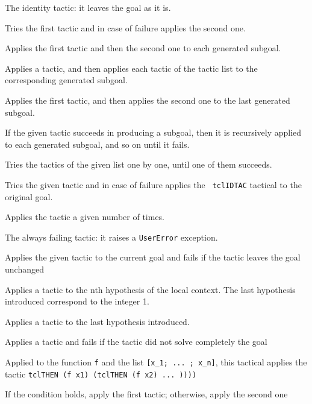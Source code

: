 \begin{description}
    {The identity tactic: it leaves the goal as it is.}

    {Tries the first tactic and in case of failure applies the second one.}

  {Applies the first tactic and then the second one to each generated subgoal.}

    {Applies a tactic, and then applies each tactic of the tactic list to the
     corresponding generated subgoal.}

    {Applies the first tactic, and then applies the second one to the last
     generated subgoal.}

    {If the given tactic succeeds in producing a subgoal, then it
     is recursively applied to each generated subgoal, 
     and so on until it fails. }

    {Tries the tactics of the given list one by one, until one of them
     succeeds.}

    {Tries the given tactic and in case of failure applies the {\tt
    tclIDTAC} tactical to the original goal.}

    {Applies the tactic a given number of times.}

    {The always failing tactic: it raises a {\tt UserError} exception.}

    {Applies the given tactic to the current goal and fails if the 
     tactic leaves the goal unchanged}

    {Applies a tactic to the nth hypothesis of the local context.
     The last hypothesis introduced correspond to the integer 1.}

    {Applies a tactic to the last hypothesis introduced.}

    {Applies a tactic and fails if the tactic did not solve completely the
      goal}

    {Applied to the function \texttt{f} and the list \texttt{[x\_1;
        ... ; x\_n]}, this tactical applies the tactic
      \texttt{tclTHEN (f x1) (tclTHEN (f x2) ... ))))}}
    
    {If the condition holds, apply the first tactic; otherwise,
      apply the second one}

\end{description}


